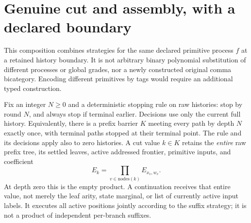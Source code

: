 \documentclass[11pt]{article}
\begin{document}
\section{Genuine cut and assembly, with a declared boundary}
This composition combines strategies for the same declared primitive process $f$ at a retained history boundary. It is not arbitrary binary polynomial substitution of different processes or global grades, nor a newly constructed original comma bicategory. Encoding different primitives by tags would require an additional typed construction.

Fix an integer $N\geq0$ and a deterministic stopping rule on raw histories: stop by round $N$, and always stop if terminal earlier. Decisions use only the current full history. Equivalently, there is a prefix barrier $K$ meeting every path by depth $N$ exactly once, with terminal paths stopped at their terminal point. The rule and its decisions apply also to zero histories. A cut value $k\in K$ retains the \emph{entire} raw prefix tree, its settled leaves, active addressed frontier, primitive inputs, and coefficient
\[
 E_k=\prod_{v\in\mathrm{nodes}(k)}E_{x_v,w_v}.
\]
At depth zero this is the empty product. A continuation receives that entire value, not merely the leaf arity, state marginal, or list of currently active input labels. It executes all active positions jointly according to the suffix strategy; it is not a product of independent per-branch suffixes.
\end{document}
